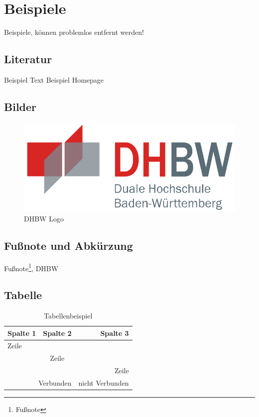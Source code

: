





\chapter{Beispiele}
Beispiele, können problemlos entfernt werden!
\section{Literatur}
Beispiel Text \cite[S. 10]{testBuch1}
Beispiel Homepage\cite{urlId} \\

\section{Bilder}
\begin{figure}[H]
	\centering
	\includegraphics[width=0.3\linewidth]{resources/images/logo-dhbw}
	\caption{DHBW Logo}
	\label{fig:logo-dhbw}
\end{figure}

\section{Fußnote und Abkürzung}
Fußnote\footnote{Fußnote}, \ac{DHBW}

\section{Tabelle}
\begin{table}[H]
	\centering
	\caption{Tabellenbeispiel}
	\label{tab:example}
	\begin{tabular}{|l|c|r|}
		\hline
		Spalte 1 & Spalte 2 & Spalte 3 \\
		\hline
		Zeile  &  &  \\
		\hline
		& Zeile &  \\
		\hline
		&  & Zeile \\
		\hline
		\multicolumn{2}{|r|}{Verbunden}	& nicht Verbunden \\
		\hline
	\end{tabular}
\end{table}

